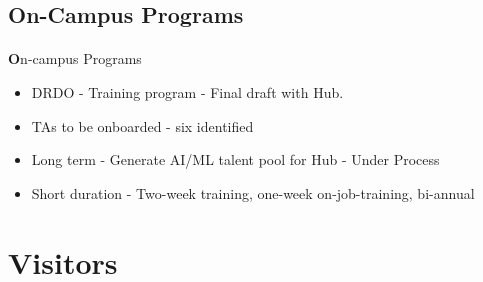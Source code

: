 \documentclass[aspectratio=169]{beamer}
\begin{document}



\subsection{On-Campus Programs}
\begin{frame}[fragile=singleslide]{\insertsectionhead}
  \framesubtitle{\insertsubsectionhead}
  \textbf  On-campus Programs
  \begin{itemize}
   \item DRDO - Training program - Final draft with Hub.
   \item \alert {TAs to be onboarded - six identified}
\item \alert{Long term - Generate AI/ML talent pool for Hub - Under Process}
\item \alert{Short duration - Two-week training, one-week on-job-training, bi-annual}
  \end{itemize}
\end{frame}

\section{Visitors}
\end{document}
